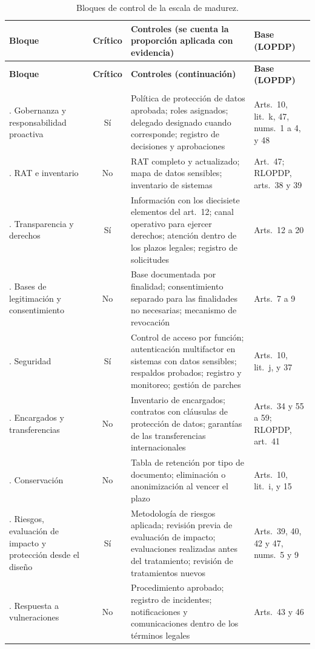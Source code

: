 {\scriptsize
\renewcommand{\arraystretch}{1.15}
\begin{xltabular}{\textwidth}{|>{\raggedright\arraybackslash}p{3.0cm}|c|L|>{\raggedright\arraybackslash}p{2.4cm}|}
  \caption{Bloques de control de la escala de madurez.}
  \label{tab:bloques_madurez} \\
  \hline
  \textbf{Bloque} & \textbf{Crítico} & \textbf{Controles (se cuenta la proporción aplicada con evidencia)} & \textbf{Base (LOPDP)} \\
  \hline
  \endfirsthead
  \hline
  \textbf{Bloque} & \textbf{Crítico} & \textbf{Controles (continuación)} & \textbf{Base (LOPDP)} \\
  \hline
  \endhead
  \hline
   \\
  \endfoot
  \hline
  . Gobernanza y responsabilidad proactiva & Sí & Política de protección de datos aprobada; roles asignados; delegado designado cuando corresponde; registro de decisiones y aprobaciones & Arts.~10, lit.~k, 47, nums.~1 a 4, y 48 \\ . RAT e inventario & No & RAT completo y actualizado; mapa de datos sensibles; inventario de sistemas & Art.~47; RLOPDP, arts.~38 y 39 \\ . Transparencia y derechos & Sí & Información con los diecisiete elementos del art.~12; canal operativo para ejercer derechos; atención dentro de los plazos legales; registro de solicitudes & Arts.~12 a 20 \\ . Bases de legitimación y consentimiento & No & Base documentada por finalidad; consentimiento separado para las finalidades no necesarias; mecanismo de revocación & Arts.~7 a 9 \\ . Seguridad & Sí & Control de acceso por función; autenticación multifactor en sistemas con datos sensibles; respaldos probados; registro y monitoreo; gestión de parches & Arts.~10, lit.~j, y 37 \\ . Encargados y transferencias & No & Inventario de encargados; contratos con cláusulas de protección de datos; garantías de las transferencias internacionales & Arts.~34 y 55 a 59; RLOPDP, art.~41 \\ . Conservación & No & Tabla de retención por tipo de documento; eliminación o anonimización al vencer el plazo & Arts.~10, lit.~i, y 15 \\ . Riesgos, evaluación de impacto y protección desde el diseño & Sí & Metodología de riesgos aplicada; revisión previa de evaluación de impacto; evaluaciones realizadas antes del tratamiento; revisión de tratamientos nuevos & Arts.~39, 40, 42 y 47, nums.~5 y 9 \\ . Respuesta a vulneraciones & No & Procedimiento aprobado; registro de incidentes; notificaciones y comunicaciones dentro de los términos legales & Arts.~43 y 46 \\ \hline
\end{xltabular}
}
{\raggedright{}\par}

